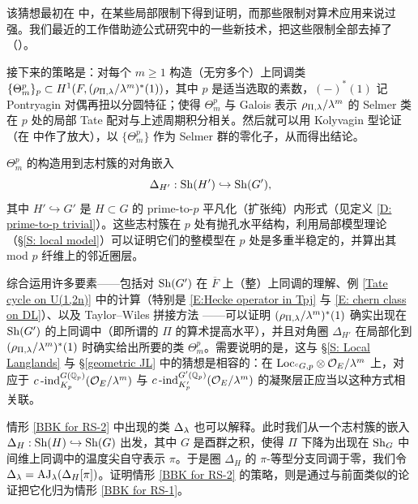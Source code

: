 该猜想最初在 \cite{Zhang-GGP} 中，在某些局部限制下得到证明，而那些限制对算术应用来说过强。我们最近的工作借助迹公式研究中的一些新技术，把这些限制全部去掉了（\cite{BLZZ-GGP}）。

接下来的策略是：对每个 $m\geq 1$ 构造（无穷多个）上同调类 $\{\Theta_m^p\}_p\subset H^1(F, (\rho_{\Pi,{\lambda}}/{\lambda}^m)^*(1))$，其中 $p$ 是适当选取的素数，$(-)^*(1)$ 记 Pontryagin 对偶再扭以分圆特征；使得 $\Theta_m^p$ 与 Galois 表示 $\rho_{\Pi,{\lambda}}/{\lambda}^m$ 的 Selmer 类在 $p$ 处的局部 Tate 配对与上述周期积分相关。然后就可以用 Kolyvagin 型论证（在 \cite{Liu-HZ-Cycle, LTXZZ-BBK} 中作了放大），以 $\{\Theta_m^p\}$ 作为 Selmer 群的零化子，从而得出结论。

$\Theta_m^p$ 的构造用到志村簇的对角嵌入
\[
\Delta_{H'}: {\operatorname{Sh}}(H')\hookrightarrow {\operatorname{Sh}}(G'),
\]
其中 $H'\hookrightarrow G'$ 是 $H\subset G$ 的 prime-to-$p$ 平凡化（扩张纯）内形式（见定义 \ref{D: prime-to-p trivial}）。这些志村簇在 $p$ 处有抛孔水平结构，利用局部模型理论（\S\ref{S: local model}）可以证明它们的整模型在 $p$ 处是多重半稳定的，并算出其 mod $p$ 纤维上的邻近圈层。

综合运用许多要素——包括对 ${\operatorname{Sh}}(G')$ 在 $\overline{F}$ 上（整）上同调的理解、例 \ref{Tate cycle on U(1,2n)} 中的计算（特别是 \eqref{E:Hecke operator in Tpj} 与 \eqref{E: chern class on DL}）、以及 Taylor--Wiles 拼接方法 \cite{LTXZZ-Rigidity}——可以证明 $(\rho_{\Pi,{\lambda}}/{\lambda}^m)^*(1)$ 确实出现在 ${\operatorname{Sh}}(G')$ 的上同调中（即所谓的 $\Pi$ 的算术提高水平），并且对角圈 $\Delta_{H'}$ 在局部化到 $(\rho_{\Pi,{\lambda}}/{\lambda}^m)^*(1)$ 时确实给出所要的类 $\Theta_m^p$。需要说明的是，这与 \S\ref{S: Local Langlands} 与 \S\ref{geometric JL} 中的猜想是相容的：在 ${\operatorname{Loc}}_{{}^cG,p}\otimes {\mathcal O}_E/{\lambda}^m$ 上，对应于 $c\operatorname{-ind}_{K_p}^{G({\mathbb Q}_p)}({\mathcal O}_E/{\lambda}^m)$ 与 $c\operatorname{-ind}_{K'_p}^{G'({\mathbb Q}_p)}({\mathcal O}_E/{\lambda}^m)$ 的凝聚层正应当以这种方式相关联。

情形 \eqref{BBK for RS-2} 中出现的类 $\Delta_{\lambda}$ 也可以解释。此时我们从一个志村簇的嵌入 $\Delta_H: {\operatorname{Sh}}(H)\hookrightarrow{\operatorname{Sh}}(G)$ 出发，其中 $G$ 是酉群之积，使得 $\Pi$ 下降为出现在 ${\operatorname{Sh}}_G$ 中间维上同调中的温度尖自守表示 $\pi$。于是圈 $\Delta_H$ 的 $\pi$-等型分支同调于零，我们令 $\Delta_{\lambda}=\operatorname{AJ}_{\lambda}(\Delta_H[\pi])$。证明情形 \eqref{BBK for RS-2} 的策略，则是通过与前面类似的论证把它化归为情形 \eqref{BBK for RS-1}。
